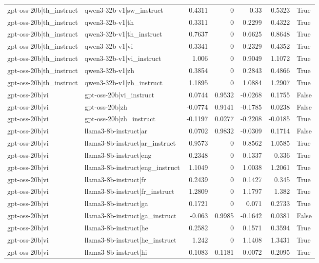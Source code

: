 \begin{table}
\begin{tabular}{l l r r r r l}
gpt-oss-20b|th_instruct & qwen3-32b-v1|sw_instruct & 0.4311 & 0 & 0.33 & 0.5323 & True \\
gpt-oss-20b|th_instruct & qwen3-32b-v1|th & 0.3311 & 0 & 0.2299 & 0.4322 & True \\
gpt-oss-20b|th_instruct & qwen3-32b-v1|th_instruct & 0.7637 & 0 & 0.6625 & 0.8648 & True \\
gpt-oss-20b|th_instruct & qwen3-32b-v1|vi & 0.3341 & 0 & 0.2329 & 0.4352 & True \\
gpt-oss-20b|th_instruct & qwen3-32b-v1|vi_instruct & 1.006 & 0 & 0.9049 & 1.1072 & True \\
gpt-oss-20b|th_instruct & qwen3-32b-v1|zh & 0.3854 & 0 & 0.2843 & 0.4866 & True \\
gpt-oss-20b|th_instruct & qwen3-32b-v1|zh_instruct & 1.1895 & 0 & 1.0884 & 1.2907 & True \\
gpt-oss-20b|vi & gpt-oss-20b|vi_instruct & 0.0744 & 0.9532 & -0.0268 & 0.1755 & False \\
gpt-oss-20b|vi & gpt-oss-20b|zh & -0.0774 & 0.9141 & -0.1785 & 0.0238 & False \\
gpt-oss-20b|vi & gpt-oss-20b|zh_instruct & -0.1197 & 0.0277 & -0.2208 & -0.0185 & True \\
gpt-oss-20b|vi & llama3-8b-instruct|ar & 0.0702 & 0.9832 & -0.0309 & 0.1714 & False \\
gpt-oss-20b|vi & llama3-8b-instruct|ar_instruct & 0.9573 & 0 & 0.8562 & 1.0585 & True \\
gpt-oss-20b|vi & llama3-8b-instruct|eng & 0.2348 & 0 & 0.1337 & 0.336 & True \\
gpt-oss-20b|vi & llama3-8b-instruct|eng_instruct & 1.1049 & 0 & 1.0038 & 1.2061 & True \\
gpt-oss-20b|vi & llama3-8b-instruct|fr & 0.2439 & 0 & 0.1427 & 0.345 & True \\
gpt-oss-20b|vi & llama3-8b-instruct|fr_instruct & 1.2809 & 0 & 1.1797 & 1.382 & True \\
gpt-oss-20b|vi & llama3-8b-instruct|ga & 0.1721 & 0 & 0.071 & 0.2733 & True \\
gpt-oss-20b|vi & llama3-8b-instruct|ga_instruct & -0.063 & 0.9985 & -0.1642 & 0.0381 & False \\
gpt-oss-20b|vi & llama3-8b-instruct|he & 0.2582 & 0 & 0.1571 & 0.3594 & True \\
gpt-oss-20b|vi & llama3-8b-instruct|he_instruct & 1.242 & 0 & 1.1408 & 1.3431 & True \\
gpt-oss-20b|vi & llama3-8b-instruct|hi & 0.1083 & 0.1181 & 0.0072 & 0.2095 & True \\

\end{tabular}
\end{table}
